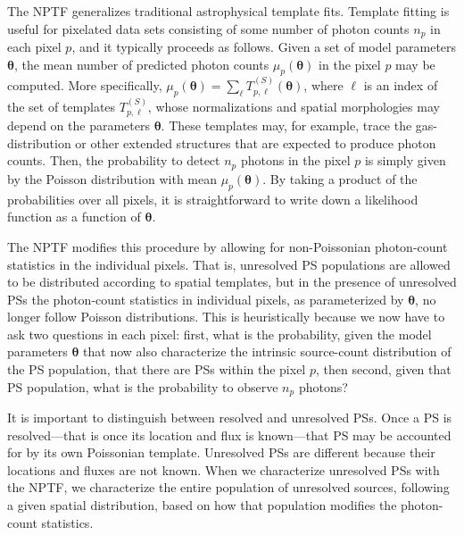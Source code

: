 The NPTF generalizes traditional astrophysical template fits.  Template fitting is useful for pixelated data sets consisting of some number of photon counts $n_p$ in each pixel $p$, and it typically proceeds as follows.   Given a set of model parameters $\bm{\theta}$, the mean number of predicted photon counts $\mu_p({\bm{\theta}})$ in the pixel $p$ may be computed.  More specifically, $\mu_p({\bm{\theta}}) = \sum_{\ell} T^{(S)}_{p,\ell}({\bm{\theta}})$, where $\ell$ is an index of the set of templates $T^{(S)}_{p, \ell}$, whose normalizations and spatial morphologies may depend on the parameters $\bm{\theta}$. These templates may, for example, trace the gas-distribution or other extended structures that are expected to produce photon counts.  Then, the probability to detect $n_p$ photons in the pixel $p$ is simply given by the Poisson distribution with mean $\mu_p({\bm{\theta}})$.  By taking a product of the probabilities over all pixels, it is straightforward to write down a likelihood function as a function of ${\bm{\theta}}$.  

The NPTF modifies this procedure by allowing for non-Poissonian photon-count statistics in the individual pixels.  That is, unresolved PS populations are allowed to be distributed according to spatial templates, but in the presence of unresolved PSs the photon-count statistics in individual pixels, as parameterized by ${\bm{\theta}}$, no longer follow Poisson distributions.  This is heuristically because we now have to ask two questions in each pixel: first, what is the probability, given the model parameters ${\bm{\theta}}$ that now also characterize the intrinsic source-count distribution of the PS population, that there are PSs within the pixel $p$, then second, given that PS population, what is the probability to observe $n_p$ photons?

It is important to distinguish between resolved and unresolved PSs.  Once a PS is resolved---that is once its location and flux is known---that PS may be accounted for by its own Poissonian template.  Unresolved PSs are different because their locations and fluxes are not known.  When we characterize unresolved PSs with the NPTF, we characterize the entire population of unresolved sources, following a given spatial distribution, based on how that population modifies the photon-count statistics.
  

